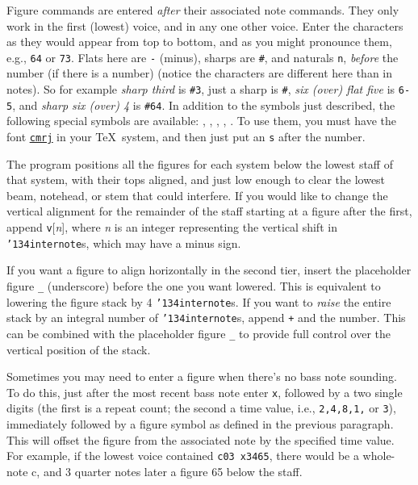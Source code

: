 \documentclass[11pt]{article}
\def\bs{{\tt\char'134}}
\def\newfrom{2.59}  %
\def\NEW#1{\ifdim#1 pt<\newfrom pt\else%
\marginpar{\fbox{#1}}\fi}
\begin{document}
	Figure commands are entered {\it after} their associated note commands.  
They only work in the first (lowest) voice, and in any one other voice\NEW{2.6}.
Enter the characters as 
they would appear from top to bottom, and as you might pronounce them, 
e.g., {\tt 64} or {\tt 73}.  Flats here are {\tt -} (minus), sharps are 
{\tt \#}, and 
naturals {\tt n}, {\it before} the number (if there is a number) (notice
the characters are different here than in notes).  
So for example {\it sharp third} is {\tt \#3}, just a sharp is {\tt \#}, {\it six (over) 
flat five} is {\tt 6-5}, and {\it sharp six (over) 4} is {\tt \#64}.  
In addition to the symbols just described, the following special symbols
are available: {}, {}, {}, {}, {} .
\NEW{2.6}To use them, you must have the font 
\href{http://www.icking-music-archive.org/software/musixtex/add-ons/figbas.zip}{\underline{\tt cmrj}}
in your \TeX~system, and then just put an {\tt s} after the number.

The program 
positions all the figures for each system below the lowest staff of that 
system, with their tops aligned, and just low enough to clear the 
lowest beam, notehead, or stem that could interfere. If you would like to 
change the vertical alignment for the remainder of the staff starting at a 
figure after the first, \NEW{2.71}append {\tt v}[{\it n}], where {\it n} is an
integer representing the vertical shift in \bs{\tt internote}s, which may
have a minus sign.   

If you want a figure to
align horizontally in the second tier, insert the placeholder figure
{\tt\_} (underscore) before the one you want lowered. This is equivalent to
lowering the figure stack by 4 \bs{\tt internote}s.
\NEW{2.6}If you want to {\it raise} the entire stack by an integral number of
\bs{\tt internote}s, append {\tt +} and the number. This can be combined with 
the placeholder figure {\tt\_} to provide full control over the vertical 
position of the stack.

	Sometimes you may need to enter a figure when there's no bass 
note sounding.  To do this, just after the most recent bass note enter 
{\tt x}, followed by a two single digits (the first is a repeat count; the 
second a time value, i.e., {\tt 2,4,8,1,} or {\tt 3}), immediately followed by a figure symbol 
as defined in the previous paragraph.  This will 
offset the figure from the associated note by the specified time 
value.  For example, if the lowest voice contained {\tt c03 x3465}, there 
would be a whole-note c, and 3 quarter notes later a figure 65 below 
the staff.
\end{document}
